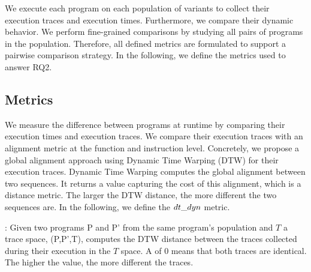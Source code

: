 We execute each program on each population of variants to collect their execution traces and execution times. Furthermore, we compare their dynamic behavior. We perform fine-grained comparisons by studying all pairs of programs in the population. Therefore, all defined metrics are formulated to support a pairwise comparison strategy.
In the following, we define the metrics used to answer RQ2.

\subsection*{Metrics}

We measure the difference between programs at runtime by comparing their execution times and execution traces. We compare their execution traces with an alignment metric at the function and instruction level. Concretely, we propose a global alignment approach using Dynamic Time Warping (DTW) for their execution traces. %
Dynamic Time Warping \cite{Maia08usinga} computes the global alignment between two sequences. It returns a value capturing the cost of this alignment, which is a distance metric. The larger the DTW distance, the more different the two sequences are.
In the following, we define the $dt\_dyn$ metric. 
 

\begin{metric}{\DTW{}:}
\label{metric:stack}
	Given two programs P and P' from the same program's population and $T$ a trace space, \DTW{}(P,P',T), computes the DTW distance between the traces collected during their execution in the $T$ space. A \DTW{} of $0$ means that both traces are identical. \\ 
	
	The higher the value, the more different the traces. 
\end{metric}


